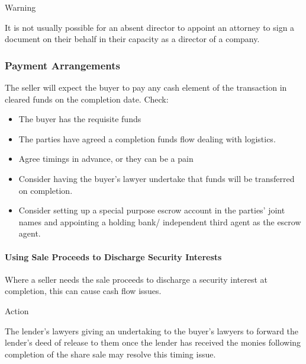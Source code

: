 \documentclass[
]{article}
\providecommand{\tightlist}{%
  \setlength{\itemsep}{0pt}\setlength{\parskip}{0pt}}
\newenvironment{env-a57f3fff-c46d-4aeb-b36c-ada0d8066098}
{
    \savenotes\tcolorbox[blanker,breakable,left=5pt,borderline west={2pt}{-4pt}{aquamarine}]
}
{
    \endtcolorbox\spewnotes
}
\newenvironment{env-f3fdeea8-9a69-4242-ac7f-874202f0281b}
{
    \savenotes\tcolorbox[blanker,breakable,left=5pt,borderline west={2pt}{-4pt}{orange}]
}
{
    \endtcolorbox\spewnotes
}
\begin{document}
\begin{env-f3fdeea8-9a69-4242-ac7f-874202f0281b}

Warning

It is not usually possible for an absent director to appoint an attorney
to sign a document on their behalf in their capacity as a director of a
company.

\end{env-f3fdeea8-9a69-4242-ac7f-874202f0281b}

\hypertarget{payment-arrangements}{%
\subsubsection{Payment Arrangements}\label{payment-arrangements}}

The seller will expect the buyer to pay any cash element of the
transaction in cleared funds on the completion date. Check:

\begin{itemize}
\tightlist
\item
  The buyer has the requisite funds
\item
  The parties have agreed a completion funds flow dealing with
  logistics.
\item
  Agree timings in advance, or they can be a pain
\item
  Consider having the buyer's lawyer undertake that funds will be
  transferred on completion.
\item
  Consider setting up a special purpose escrow account in the parties'
  joint names and appointing a holding bank/ independent third agent as
  the escrow agent.
\end{itemize}

\hypertarget{using-sale-proceeds-to-discharge-security-interests}{%
\paragraph{Using Sale Proceeds to Discharge Security
Interests}\label{using-sale-proceeds-to-discharge-security-interests}}

Where a seller needs the sale proceeds to discharge a security interest
at completion, this can cause cash flow issues.

\begin{env-a57f3fff-c46d-4aeb-b36c-ada0d8066098}

Action

The lender's lawyers giving an undertaking to the buyer's lawyers to
forward the lender's deed of release to them once the lender has
received the monies following completion of the share sale may resolve
this timing issue.

\end{env-a57f3fff-c46d-4aeb-b36c-ada0d8066098}
\end{document}
